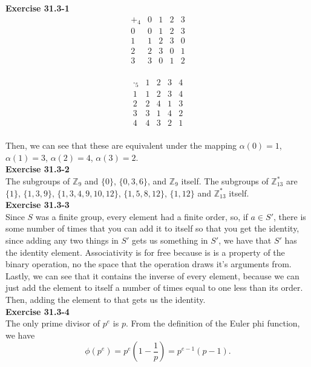 \documentclass{article}
\begin{document}
\noindent\textbf{Exercise 31.3-1}\\

\[
\begin{array}{c|cccc}
+_4&0&1&2&3\\
\hline
0&0&1&2&3\\
1&1&2&3&0\\
2&2&3&0&1\\
3&3&0&1&2\\
\end{array}
\]

\[
\begin{array}{c|cccc}
\cdot_5&1&2&3&4\\
\hline
1&1&2&3&4\\
2&2&4&1&3\\
3&3&1&4&2\\
4&4&3&2&1\\
\end{array}
\]

Then, we can see that these are equivalent under the mapping $\alpha(0) =1$, $\alpha(1)= 3$, $\alpha(2) = 4$, $\alpha(3) =2$.\\

\noindent\textbf{Exercise 31.3-2}\\

The subgroups of $\mathbb{Z}_9$ and $\{0\}$, $\{0,3,6\}$, and $\mathbb{Z}_9$ itself.  The subgroups of $\mathbb{Z}_{13}^*$ are $\{ 1\}$, $\{1,3,9\}$, $\{1,3,4,9,10,12\}$, $\{1,5,8,12\}$, $\{1,12\}$ and $\mathbb{Z}_{13}^*$ itself. \\

\noindent\textbf{Exercise 31.3-3}\\

Since $S$ was a finite group, every element had a finite order, so, if $a\in S'$, there is some number of times that you can add it to itself so that you get the identity, since adding any two things in $S'$ gets us something in $S'$, we have that $S'$ has the identity element. Associativity is for free because is is a property of the binary operation, no the space that the operation draws it's arguments from. Lastly, we can see that it contains the inverse of every element, because we can just add the element to itself a number of times equal to one less than its order. Then, adding the element to that gets us the identity.\\

\noindent\textbf{Exercise 31.3-4}\\

The only prime divisor of $p^e$ is $p$.  From the definition of the Euler phi function, we have
\[ \phi(p^e) = p^e\left(1-\frac{1}{p}\right) = p^{e-1}(p-1).\]
\end{document}
